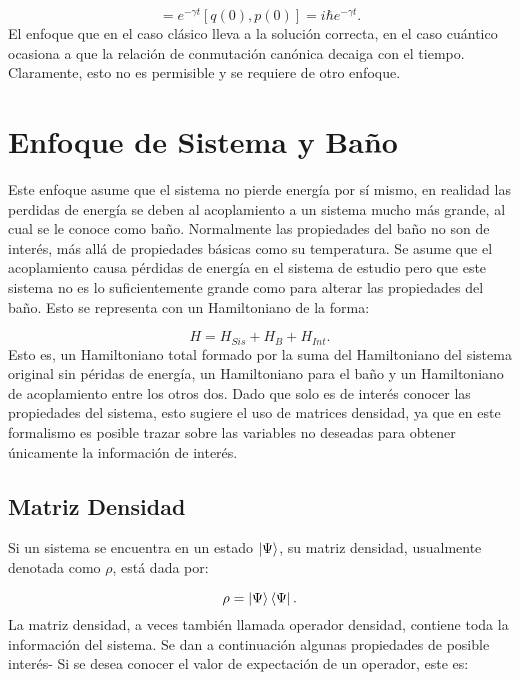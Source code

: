 \documentclass[a4paper,10pt]{report}
\begin{document}
\begin{equation}
[q(t),p(t)] = e^{-\gamma t}[q(0),p(0)] = i\hbar e^{-\gamma t}.
\end{equation} El enfoque que en el caso clásico lleva a la solución correcta, en el caso cuántico ocasiona a que la relación de conmutación canónica decaiga con el tiempo. Claramente, esto no es permisible y se requiere de otro enfoque.

\section{Enfoque de Sistema y Baño}

Este enfoque asume que el sistema no pierde energía por sí mismo, en realidad las perdidas de energía se deben al acoplamiento a un sistema mucho más grande, al cual se le conoce como baño. Normalmente las propiedades del baño no son de interés, más allá de propiedades básicas como su temperatura. Se asume que el acoplamiento causa pérdidas de energía en el sistema de estudio pero que este sistema no es lo suficientemente grande como para alterar las propiedades del baño. Esto se representa con un Hamiltoniano de la forma:

\begin{equation} \label{BathSysH}
H = H_{Sis} + H_{B} + H_{Int}.
\end{equation} Esto es, un Hamiltoniano total formado por la suma del Hamiltoniano del sistema original sin péridas de energía, un Hamiltoniano para el baño y un Hamiltoniano de acoplamiento entre los otros dos.  Dado que solo es de interés conocer las propiedades del sistema, esto sugiere el uso de matrices densidad, ya que en este formalismo es posible trazar sobre las variables no deseadas para obtener únicamente la información de interés.

\subsection{Matriz Densidad}

Si un sistema se encuentra en un estado $\Ket{\Psi}$, su matriz densidad\cite{BlumDM}, usualmente denotada como $\rho$, está dada por:

\begin{equation}
\rho = \Ket{\Psi}\Bra{\Psi}.
\end{equation} La matriz densidad, a veces también llamada operador densidad, contiene toda la información del sistema. Se dan a continuación algunas propiedades de posible interés- Si se desea conocer el valor de expectación de un operador, este es:
\end{document}
